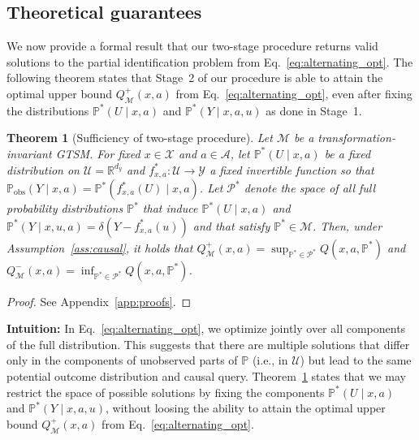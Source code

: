 \documentclass{article} %
\newcommand{\R}{\mathbb{R}}
\theoremstyle{definition}
\theoremstyle{plain}
\newtheorem{theorem}{Theorem}
\begin{document}
\subsection{Theoretical guarantees}
\label{sec:theoretical_guaranteess}

We now provide a formal result that our two-stage procedure returns valid solutions to the partial identification problem from Eq.~\eqref{eq:alternating_opt}. The following theorem states that Stage~2 of our procedure is able to attain the optimal upper bound $Q^+_\mathcal{M}(x, a)$ from Eq.~\eqref{eq:alternating_opt}, even after fixing the distributions $\mathbb{P}^\ast(U \mid x, a)$ and $\mathbb{P}^\ast(Y \mid x, a, u)$ as done in Stage~1.


\begin{theorem}[Sufficiency of two-stage procedure]\label{thrm:main}
Let $\mathcal{M}$ be a transformation-invariant GTSM. For fixed $x \in \mathcal{X}$ and $a \in \mathcal{A}$, let $\mathbb{P}^\ast(U \mid x, a)$ be a fixed distribution on $\mathcal{U} = \R^{d_y}$ and $f^\ast_{x, a} \colon \mathcal{U} \to \mathcal{Y}$ a fixed invertible function so that $\mathbb{P}_\mathrm{obs}(Y \mid x, a) =  \mathbb{P}^\ast(f^\ast_{x, a}(U) \mid x, a)$. Let $\mathcal{P}^\ast$ denote the space of all full probability distributions $\mathbb{P}^\ast$ that induce $\mathbb{P}^\ast(U \mid x, a)$ and $\mathbb{P}^\ast(Y \mid x, u, a) = \delta(Y - f^\ast_{x, a}(u))$ and that satisfy $\mathbb{P}^\ast \in \mathcal{M}$. Then, under Assumption~\ref{ass:causal}, it holds that $Q^+_\mathcal{M}(x, a) = \sup_{\mathbb{P}^\ast \in \mathcal{P}^\ast} Q(x, a, \mathbb{P}^\ast)$ and $Q^-_\mathcal{M}(x, a) = \inf_{\mathbb{P}^\ast \in \mathcal{P}^\ast} Q(x, a, \mathbb{P}^\ast)$.
\end{theorem}
\begin{proof}
    See Appendix~\ref{app:proofs}.
\end{proof}
\textbf{Intuition:} In Eq.~\eqref{eq:alternating_opt}, we optimize jointly over all components of the full distribution. This suggests that there are multiple solutions that differ only in the components of unobserved parts of $\mathbb{P}$ (i.e., in $\mathcal{U}$) but lead to the same potential outcome distribution and causal query. Theorem~\ref{thrm:main} states that we may restrict the space of possible solutions by fixing the components $\mathbb{P}^\ast(U \mid x, a)$ and $\mathbb{P}^\ast(Y \mid x, a, u)$, without loosing the ability to attain the optimal upper bound $Q^+_\mathcal{M}(x, a)$ from Eq.~\eqref{eq:alternating_opt}.
\end{document}
